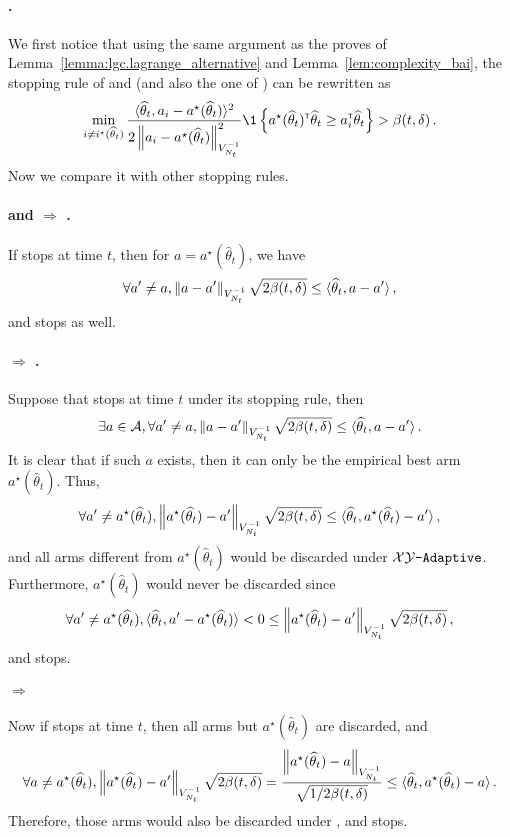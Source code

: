 \paragraph{\LG{}.}
We first notice that using the same argument as the proves of Lemma~\ref{lemma:lgc.lagrange_alternative} and Lemma~\ref{lem:complexity_bai}, the stopping rule of \LG and \LGC (and also the one of \GLUCB) can be rewritten as
\[
	\min_{i \neq i^\star(\hat{\theta}_{t})} \dfrac{\langle\hat\theta_t,a_{i}-a^\star(\hat\theta_t)\rangle^2}{2\normm{a_i - a^\star(\hat\theta_t)}_{{V_{N_t}^{-1}}}^2} \1\left\{a^\star(\hat\theta_t)^\top\hat\theta_t \geq a_i^\top\hat\theta_t\right\} > \beta(t,\delta)\,.
\]
Now we compare it with other stopping rules.

\paragraph{\LGC and \LG $\Rightarrow$ \XYS.}
If \LGC stops at time $t$, then for $a = a^\star(\hat\theta_t)$, we have
\[
    \forall a'\neq a, \left\lVert a-a'\right\rVert_{V_{N_t}^{-1}}\sqrt{2\beta(t,\delta)}\leq \langle\widehat\theta_t,a - a'\rangle\,,
\]
and \XYS stops as well.

\paragraph{\XYS $\Rightarrow$ \XYA.}
Suppose that \XYS stops at time $t$ under its stopping rule, then
\[
\exists a\in\mathcal{A}, \forall a'\neq a, \left\lVert a-a'\right\rVert_{V_{N_t}^{-1}}\sqrt{2\beta(t,\delta)}\leq \langle\widehat\theta_t,a - a'\rangle\,.
\]
It is clear that if such $a$ exists, then it can only be the empirical best arm $a^\star(\hat\theta_t)$. Thus,
\[
    \forall a'\neq a^\star(\widehat\theta_t), \left\lVert a^\star(\widehat\theta_t)-a'\right\rVert_{V_{N_t}^{-1}}\sqrt{2\beta(t,\delta)}\leq\langle\widehat\theta_t,a^\star(\widehat\theta_t)-a'\rangle\,,
\]
and all arms different from $a^\star(\hat\theta_t)$ would be discarded under $\texttt{$\mathcal{X}\mathcal{Y}$-Adaptive}$. Furthermore, $a^\star(\hat\theta_t)$ would never be discarded since
\[
    \forall a'\neq a^\star(\widehat\theta_t), \langle\widehat\theta_t,a'-a^\star(\widehat\theta_t)\rangle < 0 \le \left\lVert a^\star(\widehat\theta_t)-a'\right\rVert_{V_{N_t}^{-1}}\sqrt{2\beta(t,\delta)}\,,
\]
and \XYA stops.

\paragraph{\XYA $\Rightarrow$ \ALBA}
Now if \XYA stops at time $t$, then all arms but $a^\star(\hat\theta_t)$ are discarded, and
\[
    \forall a \neq a^\star(\widehat\theta_t), \left\lVert a^\star(\widehat\theta_t)-a'\right\rVert_{V_{N_t}^{-1}}\sqrt{2\beta(t,\delta)} = \dfrac{\left\lVert a^\star(\widehat\theta_t)-a\right\rVert_{V_{N_t}^{-1}}}{\sqrt{1/2\beta(t,\delta)}} \le \langle\widehat\theta_t,a^\star(\widehat\theta_t)-a\rangle\,.
\]
Therefore, those arms would also be discarded under \ALBA, and \ALBA stops.

